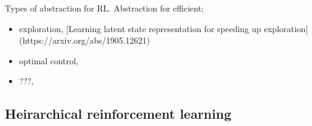 Types of abstraction for RL. Abstraction for efficient;

\begin{itemize}
\tightlist
\item
  exploration, [Learning latent state representation for speeding up exploration](https://arxiv.org/abs/1905.12621)
\item
  optimal control,
\item
  ???,
\end{itemize}


\subsection{Heirarchical reinforcement learning}
